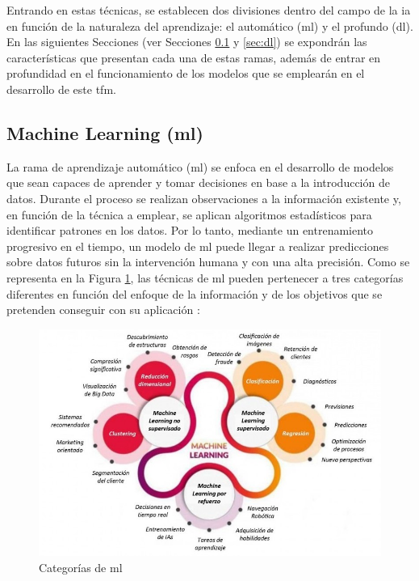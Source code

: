 \vspace{3mm}

Entrando en estas técnicas, se establecen dos divisiones dentro del campo de la \gls{ia} en función de la naturaleza del aprendizaje: el automático (\acrfull{ml}) y el profundo (\acrfull{dl}). En las siguientes Secciones (ver Secciones \ref{sec:ml} y \ref{sec:dl}) se expondrán las características que presentan cada una de estas ramas, además de entrar en profundidad en el funcionamiento de los modelos que se emplearán en el desarrollo de este \gls{tfm}.

\subsection{Machine Learning (\acrshort{ml})}
\label{sec:ml}

La rama de aprendizaje automático (\acrfull{ml}) se enfoca en el desarrollo de modelos que sean capaces de aprender y tomar decisiones en base a la introducción de datos. Durante el proceso se realizan observaciones a la información existente y, en función de la técnica a emplear, se aplican algoritmos estadísticos para identificar patrones en los datos. Por lo tanto, mediante un entrenamiento progresivo en el tiempo, un modelo de \gls{ml} puede llegar a realizar predicciones sobre datos futuros sin la intervención humana y con una alta precisión. Como se representa en la Figura \ref{fig:ml}, las técnicas de \gls{ml} pueden pertenecer a tres categorías diferentes en función del enfoque de la información y de los objetivos que se pretenden conseguir con su aplicación \cite{mlcat} \cite{iageeks} \cite{mltlf}:

\vspace{3mm}

\begin{figure}[h!]
    \centering
    \includegraphics[width=1\textwidth]{img/teoria/ml.jpeg}
    \caption{Categorías de \acrshort{ml} \cite{metal}}
    \label{fig:ml}
\end{figure}

